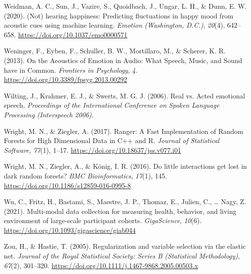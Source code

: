 \documentclass[
  man,floatsintext]{apa6}
\newlength{\cslhangindent}
\newlength{\cslentryspacingunit} %
\newenvironment{CSLReferences}[2] %
 {%
  \setlength{\parindent}{0pt}
  \ifodd #1
  \let\oldpar\par
  \def\par{\hangindent=\cslhangindent\oldpar}
  \fi
  \setlength{\parskip}{#2\cslentryspacingunit}
 }%
 {}
\begin{document}
\begin{CSLReferences}{1}{0}
\leavevmode{}%
Weidman, A. C., Sun, J., Vazire, S., Quoidbach, J., Ungar, L. H., \& Dunn, E. W. (2020). ({Not}) hearing happiness: {Predicting} fluctuations in happy mood from acoustic cues using machine learning. \emph{Emotion (Washington, D.C.)}, \emph{20}(4), 642--658. \url{https://doi.org/10.1037/emo0000571}

\leavevmode{}%
Weninger, F., Eyben, F., Schuller, B. W., Mortillaro, M., \& Scherer, K. R. (2013). On the {Acoustics} of {Emotion} in {Audio}: {What Speech}, {Music}, and {Sound} have in {Common}. \emph{Frontiers in Psychology}, \emph{4}. \url{https://doi.org/10.3389/fpsyg.2013.00292}

\leavevmode{}%
Wilting, J., Krahmer, E. J., \& Swerts, M. G. J. (2006). Real vs. Acted emotional speech. \emph{Proceedings of the International Conference on Spoken Language Processing (Interspeech 2006)}.

\leavevmode{}%
Wright, M. N., \& Ziegler, A. (2017). Ranger: {A Fast Implementation} of {Random Forests} for {High Dimensional Data} in {C}++ and {R}. \emph{Journal of Statistical Software}, \emph{77}(1), 1--17. \url{https://doi.org/10.18637/jss.v077.i01}

\leavevmode{}%
Wright, M. N., Ziegler, A., \& König, I. R. (2016). Do little interactions get lost in dark random forests? \emph{BMC Bioinformatics}, \emph{17}(1), 145. \url{https://doi.org/10.1186/s12859-016-0995-8}

\leavevmode{}%
Wu, C., Fritz, H., Bastami, S., Maestre, J. P., Thomaz, E., Julien, C., \ldots{} Nagy, Z. (2021). Multi-modal data collection for measuring health, behavior, and living environment of large-scale participant cohorts. \emph{GigaScience}, \emph{10}(6). \url{https://doi.org/10.1093/gigascience/giab044}

\leavevmode{}%
Zou, H., \& Hastie, T. (2005). Regularization and variable selection via the elastic net. \emph{Journal of the Royal Statistical Society: Series B (Statistical Methodology)}, \emph{67}(2), 301--320. \url{https://doi.org/10.1111/j.1467-9868.2005.00503.x}

\end{CSLReferences}
\end{document}
